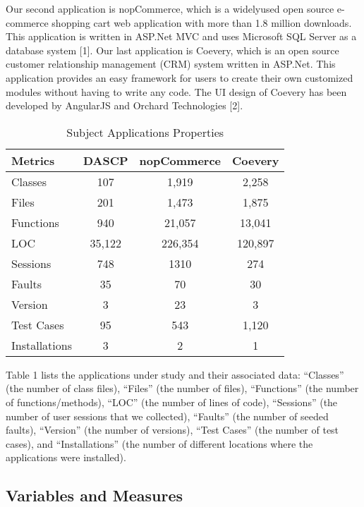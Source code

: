 Our second application is nopCommerce, which is a widelyused open source e-commerce shopping cart web application with
more than 1.8 million downloads. This application is written in
ASP.Net MVC and uses Microsoft SQL Server as a database system [1].
Our last application is Coevery, which is an open source customer relationship management (CRM) system written in ASP.Net.
This application provides an easy framework for users to create
their own customized modules without having to write any code.
The UI design of Coevery has been developed by AngularJS and
Orchard Technologies [2].


	
	\begin{table}
		\caption{Subject Applications Properties}
		\begin{center}
			\begin{tabular}{|l|c|c|c|} \hline
				\textbf{Metrics}  & \textbf{DASCP} & \textbf{nopCommerce} 
				& \textbf{Coevery} \\\hline \hline
				Classes   & 107  & 1,919& 2,258 \\\hline
				Files  & 201  & 1,473 & 1,875 \\\hline
				Functions & 940  & 21,057 & 13,041 \\\hline
				LOC & 35,122 & 226,354 &120,897 \\\hline
				Sessions  & 748 & 1310 & 274 \\\hline
				Faults  & 35 & 70 & 30\\\hline
				Version  & 3 & 23 & 3 \\\hline
				Test Cases & 95& 543 & 1,120 \\\hline
				Installations & 3 & 2 & 1 \\\hline
			\end{tabular}
			\end {center}
			\label{tab:AUTs}
		\end{table}
		
Table 1 lists the applications under study and their associated
data: “Classes” (the number of class files), “Files” (the number of
files), “Functions” (the number of functions/methods), “LOC” (the
number of lines of code), “Sessions” (the number of user sessions
that we collected), “Faults” (the number of seeded faults), “Version” (the number of versions), “Test Cases” (the number of test
cases), and “Installations” (the number of different locations where
the applications were installed).		


\subsection{Variables and Measures}
\label{sec:measures}

